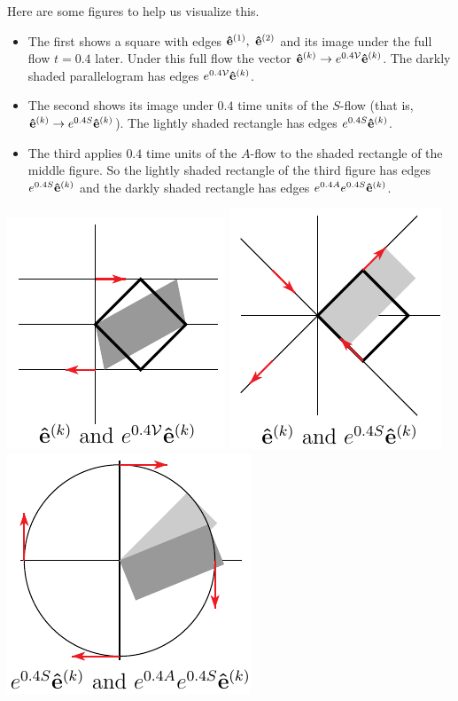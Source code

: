 \begin{eg}[$\ \vv(x,y)= 2y\hi.$]
Here are some figures to help us visualize this. 
\begin{itemize}\itemsep1pt \parskip0pt  \itemindent-15pt
\item
The first shows  a square with edges $\mathbf{\hat e}^{(1)},\ \mathbf{\hat e}^{(2)}$
and its image under the full flow $t=0.4$ later.  Under this full flow
the vector $\mathbf{\hat e}^{(k)}\rightarrow e^{0.4\mathcal{V}}\mathbf{\hat e}^{(k)}$. The darkly shaded parallelogram has edges $e^{0.4\mathcal{V}}\mathbf{\hat e}^{(k)}$.
\item
The second shows its image under $0.4$ time units of the $S$-flow (that is, $\mathbf{\hat e}^{(k)}\rightarrow e^{0.4S}\mathbf{\hat e}^{(k)}$). The lightly shaded rectangle 
has edges $e^{0.4S}\mathbf{\hat e}^{(k)}$.
\item
 The third applies $0.4$ time units of the $A$-flow to the shaded rectangle
of the middle figure. So the lightly shaded rectangle of the third figure
has edges $e^{0.4S}\mathbf{\hat e}^{(k)}$ and the darkly shaded rectangle 
has edges $e^{0.4A}e^{0.4S}\mathbf{\hat e}^{(k)}$.
\end{itemize}
\begin{wfig}
\begin{center}
    \includegraphics{square3.pdf}\qquad
    \includegraphics{square4.pdf}\qquad
    \includegraphics{square5.pdf}

\end{center}
\end{wfig}
\end{eg}
